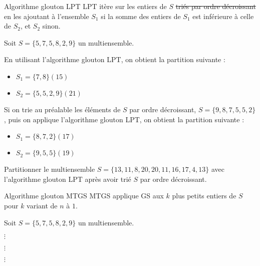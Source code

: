\documentclass[11pt]{article}
\begin{document}
  \begin{algorithme}{Algorithme glouton LPT}
    LPT itère sur les entiers de $S$ \sout{triés par ordre décroissant} en les ajoutant à l'ensemble $S_1$ si la somme des entiers de $S_1$ est inférieure à celle de $S_2$, et $S_2$ sinon.
  \end{algorithme}

  \begin{exemple}{}
    Soit $S = \{5, 7, 5, 8, 2, 9\}$ un multiensemble.

    En utilisant l'algorithme glouton LPT, on obtient la partition suivante : 

    \begin{itemize}
      \item $S_1 = \{7,8\} (15)$
      \item $S_2 = \{5,5,2,9\} (21)$
    \end{itemize}

    Si on trie au préalable les éléments de $S$ par ordre décroissant, $S = \{9, 8, 7, 5, 5, 2\}$, puis on applique l'algorithme glouton LPT, on obtient la partition suivante :

    \begin{itemize}
      \item $S_1 = \{8,7,2\} (17)$
      \item $S_2 = \{9,5,5\} (19)$
    \end{itemize}
  \end{exemple}

  \begin{exercice}{}
    Partitionner le multiensemble $S=\{13, 11, 8, 20, 20, 11, 16, 17, 4, 13\}$ avec l'algorithme glouton LPT après avoir trié $S$ par ordre décroissant.
  \end{exercice}


  \begin{algorithme}{Algorithme glouton MTGS}
    MTGS applique GS aux $k$ plus petits entiers de $S$ pour $k$ variant de $n$ à $1$.
  \end{algorithme}

  \begin{exemple}{}
    Soit $S = \{5, 7, 5, 8, 2, 9\}$ un multiensemble.

    $\vdots$

    $\vdots$

    $\vdots$
  \end{exemple}
\end{document}
